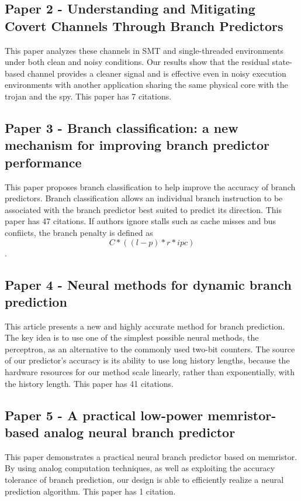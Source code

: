 \documentclass[conference]{IEEEtran}
\begin{document}
\subsection{Paper 2 - Understanding and Mitigating Covert Channels Through Branch Predictors}

This paper \cite{b2} analyzes these channels in SMT and single-threaded environments under both clean and noisy conditions. Our results show that the residual state-based channel provides a cleaner signal and is effective even in noisy execution environments with another application sharing the same physical core with the trojan and the spy. This paper has 7 citations.

\subsection{Paper 3 - Branch classification: a new mechanism for improving branch predictor performance }

This paper \cite{b3} proposes branch classification to help improve the accuracy of branch predictors. Branch classification allows an individual branch instruction to be associated with the branch predictor best suited to predict its direction. This paper has 47 citations.
If authors ignore stalls such as cache misses and bus confiicts, the branch penalty is defined as \[ C * ((l-p) * r * ipc) \].

\subsection{Paper 4 - Neural methods for dynamic branch prediction}

This article presents \cite{b4} a new and highly accurate method for branch prediction. The key idea is to use one of the simplest possible neural methods, the perceptron, as an alternative to the commonly used two-bit counters. The source of our predictor's accuracy is its ability to use long history lengths, because the hardware resources for our method scale linearly, rather than exponentially, with the history length. This paper has 41 citations.

\subsection{Paper 5 - A practical low-power memristor-based analog neural branch predictor}

This paper \cite{b5} demonstrates a practical neural branch predictor based on memristor. By using analog computation techniques, as well as exploiting the accuracy tolerance of branch prediction, our design is able to efficiently realize a neural prediction algorithm. This paper has 1 citation.
\end{document}
